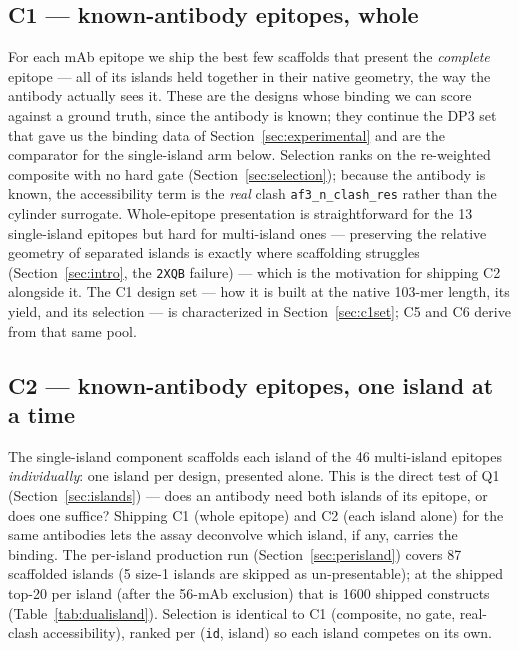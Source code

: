 \subsection{C1 --- known-antibody epitopes, whole}\label{sec:dp4c1}
For each mAb epitope we ship the best few scaffolds that present the \emph{complete} epitope ---
all of its islands held together in their native geometry, the way the antibody actually sees it.
These are the designs whose binding we can score against a ground truth, since the antibody is
known; they continue the DP3 set that gave us the binding data of Section~\ref{sec:experimental}
and are the comparator for the single-island arm below. Selection ranks on the re-weighted
composite with no hard gate (Section~\ref{sec:selection}); because the antibody is known, the
accessibility term is the \emph{real} clash \texttt{af3\_n\_clash\_res} rather than the cylinder
surrogate. Whole-epitope presentation is straightforward for the \num{13} single-island epitopes
but hard for multi-island ones --- preserving the relative geometry of separated islands is
exactly where scaffolding struggles (Section~\ref{sec:intro}, the \texttt{2XQB} failure) --- which
is the motivation for shipping C2 alongside it. The C1 design set --- how it is built at the native
\num{103}-mer length, its yield, and its selection --- is characterized in Section~\ref{sec:c1set}; C5
and C6 derive from that same pool.

\subsection{C2 --- known-antibody epitopes, one island at a time}\label{sec:dp4c2}
The single-island component scaffolds each island of the \num{46} multi-island epitopes
\emph{individually}: one island per design, presented alone. This is the direct test of Q1
(Section~\ref{sec:islands}) --- does an antibody need both islands of its epitope, or does one
suffice? Shipping C1 (whole epitope) and C2 (each island alone) for the same antibodies lets the
assay deconvolve which island, if any, carries the binding. The per-island production run
(Section~\ref{sec:perisland}) covers \num{87} scaffolded islands (\num{5} size-1 islands are
skipped as un-presentable); at the shipped top-\num{20} per island (after the 56-mAb exclusion) that
is \num{1600} shipped constructs (Table~\ref{tab:dualisland}). Selection is identical to C1 (composite, no
gate, real-clash accessibility), ranked per (\texttt{id}, island) so each island competes on its own.


